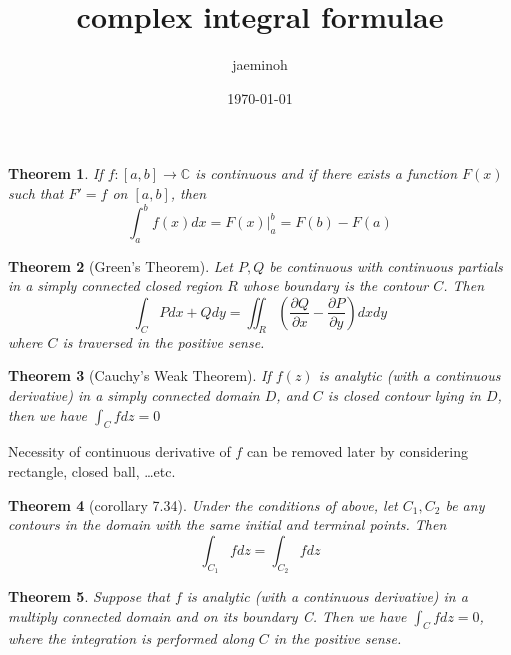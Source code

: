 \documentclass{oblivoir}
\title{complex integral formulae}
\author{jaeminoh}
\date{\today}
\newtheorem{theorem}{Theorem}
\begin{document}
\maketitle

\begin{theorem}
	If $f:\left[ a, b \right] \rightarrow \mathbb{C}$ is continuous and if there exists a function $F(x)$ such that $F' = f$ on $\left[ a,b \right]$, then 
	\begin{equation}
		\int_a^b f(x)dx = F(x)  |_a ^b = F(b) - F(a)
		\label{complexFTC}
	\end{equation}
	\label{7.30}
\end{theorem}

\begin{theorem}[Green's Theorem]
	Let $P, Q$ be continuous with continuous partials in a simply connected closed region $R$ whose boundary is the contour $C$. Then
	\begin{equation}
		\int_C Pdx + Qdy = \iint _R \left( \frac{\partial Q}{\partial x} - \frac{\partial P}{\partial y} \right)dxdy
		\label{Greenthm}
	\end{equation}
	where $C$ is traversed in the positive sense.
	\label{7.31}
\end{theorem}

\begin{theorem}[Cauchy's Weak Theorem]
	If $f(z)$ is analytic (with a continuous derivative) in a simply connected domain $D$, and $C$ is closed contour lying in $D$, then we have $\int_C f dz = 0$
	\label{7.33}
\end{theorem}

Necessity of continuous derivative of $f$ can be removed later by considering rectangle, closed ball, \ldots etc.

\begin{theorem}[corollary 7.34]
	Under the conditions of above, let $C_1, C_2$ be any contours in the domain with the same initial and terminal points. Then 
	\begin{equation}
		\int_{C_1}f dz = \int_{C_2}f dz
		\label{<+label+>}
	\end{equation}
	\label{7.34}
\end{theorem}

\begin{theorem}
	Suppose that $f$ is analytic (with a continuous derivative) in a multiply connected domain and on its boundary C. Then we have $\int_C fdz = 0$, where the integration is performed along $C$ in the positive sense.
	\label{7.36}
\end{theorem}
\end{document}
